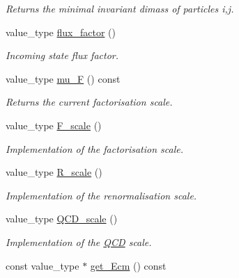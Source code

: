 \begin{DoxyCompactItemize}
\begin{DoxyCompactList}\small\item\em Returns the minimal invariant dimass of particles i,j. \end{DoxyCompactList}\item 
\hypertarget{a00441_af4e5ffb99e4c314864782c45b591f51f}{value\-\_\-type \hyperlink{a00441_af4e5ffb99e4c314864782c45b591f51f}{flux\-\_\-factor} ()}\label{a00441_af4e5ffb99e4c314864782c45b591f51f}

\begin{DoxyCompactList}\small\item\em Incoming state flux factor. \end{DoxyCompactList}\item 
\hypertarget{a00441_a0335e9bf3b57266a267c39afd9194ce4}{value\-\_\-type \hyperlink{a00441_a0335e9bf3b57266a267c39afd9194ce4}{mu\-\_\-\-F} () const }\label{a00441_a0335e9bf3b57266a267c39afd9194ce4}

\begin{DoxyCompactList}\small\item\em Returns the current factorisation scale. \end{DoxyCompactList}\item 
\hypertarget{a00441_a551146c1e75b1394b261d0f6bfe70420}{value\-\_\-type \hyperlink{a00441_a551146c1e75b1394b261d0f6bfe70420}{F\-\_\-scale} ()}\label{a00441_a551146c1e75b1394b261d0f6bfe70420}

\begin{DoxyCompactList}\small\item\em Implementation of the factorisation scale. \end{DoxyCompactList}\item 
\hypertarget{a00441_a8bc81e1eb240d91126e08566a5a7353b}{value\-\_\-type \hyperlink{a00441_a8bc81e1eb240d91126e08566a5a7353b}{R\-\_\-scale} ()}\label{a00441_a8bc81e1eb240d91126e08566a5a7353b}

\begin{DoxyCompactList}\small\item\em Implementation of the renormalisation scale. \end{DoxyCompactList}\item 
\hypertarget{a00441_ad952cbdc5f60eefb09b4630f89e42622}{value\-\_\-type \hyperlink{a00441_ad952cbdc5f60eefb09b4630f89e42622}{Q\-C\-D\-\_\-scale} ()}\label{a00441_ad952cbdc5f60eefb09b4630f89e42622}

\begin{DoxyCompactList}\small\item\em Implementation of the \hyperlink{a00449}{Q\-C\-D} scale. \end{DoxyCompactList}\item 
\hypertarget{a00441_af3ba9e129ae7001887ad013f2c615cd6}{const value\-\_\-type $\ast$ \hyperlink{a00441_af3ba9e129ae7001887ad013f2c615cd6}{get\-\_\-\-Ecm} () const }\label{a00441_af3ba9e129ae7001887ad013f2c615cd6}


\end{DoxyCompactItemize}
